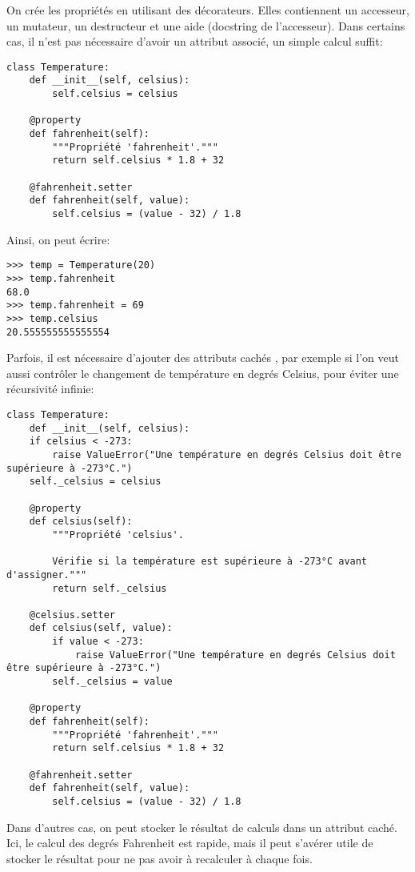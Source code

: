On crée les propriétés en utilisant des décorateurs. Elles contiennent un accesseur, un mutateur, un destructeur et une aide (docstring de l'accesseur). Dans certains cas, il n'est pas nécessaire d'avoir un attribut associé, un simple calcul suffit:

\begin{verbatim}
class Temperature:
    def __init__(self, celsius):
        self.celsius = celsius
    
    @property
    def fahrenheit(self):
        """Propriété 'fahrenheit'."""
        return self.celsius * 1.8 + 32
    
    @fahrenheit.setter
    def fahrenheit(self, value):
        self.celsius = (value - 32) / 1.8
\end{verbatim}

Ainsi, on peut écrire:
\begin{verbatim}
>>> temp = Temperature(20)
>>> temp.fahrenheit
68.0
>>> temp.fahrenheit = 69
>>> temp.celsius
20.555555555555554
\end{verbatim}

Parfois, il est nécessaire d'ajouter des attributs \og cachés \fg{}, par exemple si l'on veut aussi contrôler le changement de 
température en degrés Celsius, pour éviter une récursivité infinie:

\begin{verbatim}
class Temperature:
    def __init__(self, celsius):
    if celsius < -273:
        raise ValueError("Une température en degrés Celsius doit être supérieure à -273°C.")
    self._celsius = celsius
    
    @property
    def celsius(self):
        """Propriété 'celsius'.
        
        Vérifie si la température est supérieure à -273°C avant d'assigner."""
        return self._celsius

    @celsius.setter
    def celsius(self, value):
        if value < -273:
            raise ValueError("Une température en degrés Celsius doit être supérieure à -273°C.")
        self._celsius = value
            
    @property
    def fahrenheit(self):
        """Propriété 'fahrenheit'."""
        return self.celsius * 1.8 + 32

    @fahrenheit.setter
    def fahrenheit(self, value):
        self.celsius = (value - 32) / 1.8
\end{verbatim}

Dans d'autres cas, on peut stocker le résultat de calculs dans un attribut caché. Ici, le calcul des degrés Fahrenheit est
rapide, mais il peut s'avérer utile de stocker le résultat pour ne pas avoir à recalculer à chaque fois.\bigskip

